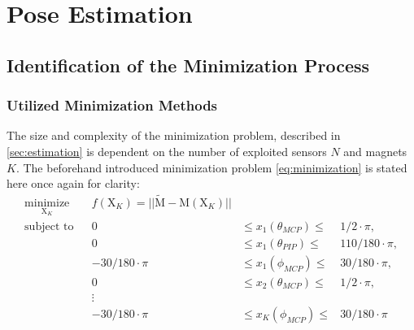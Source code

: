 \section{Pose Estimation} \label{sec:estimationRes}

\subsection{Identification of the Minimization Process} \label{subsec:resSim}

\subsubsection{Utilized Minimization Methods} \label{subsubsec:miniMethod}

The size and complexity of the minimization problem, described in \ref{sec:estimation} is dependent on the number of exploited sensors $ N $ and magnets $ K $. The beforehand introduced minimization problem \ref{eq:minimization} is stated here once again for clarity:
\begin{equation*} \label{eq:minimization}
\begin{aligned}
\underset{\mathrm{X}_K}{\text{minimize}} & & f(\mathrm{X}_K) = || \tilde{\mathrm{M}} - \mathrm{M}(\mathrm{X}_K) ||\\
\text{subject to} & & 0 & \leq {x}_1(\theta_{MCP}) \leq & 1/2 \cdot \pi, \\
				  & & 0 & \leq {x}_1(\theta_{PIP})  \leq & 110/180 \cdot \pi, \\
				  & & -30/180 \cdot \pi & \leq {x}_1(\phi_{MCP}) \leq & 30/180 \cdot \pi, \\
				  & & 0 & \leq {x}_2(\theta_{MCP})  \leq & 1/2 \cdot \pi, \\
				  & & \vdots \\
				  & & -30/180 \cdot \pi & \leq {x}_K(\phi_{MCP}) \leq & 30/180 \cdot \pi
\end{aligned}
\end{equation*}
